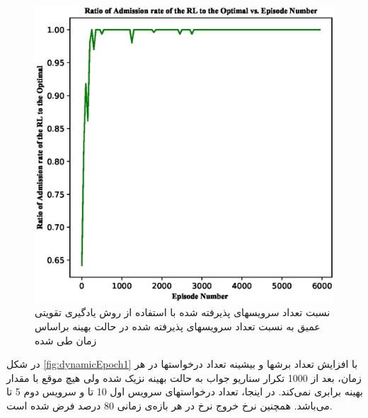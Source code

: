 \begin{figure}%
	\centering
	\includegraphics[scale = 0.6]{./fig/dynamicEpoch_0} %
	\caption{  نسبت تعداد سرویسهای پذیرفته شده با استفاده از روش یادگیری تقویتی عمیق به نسبت تعداد سرویسهای پذیرفته شده در حالت بهینه براساس زمان طی شده}
	\label{fig:dynamicEpoch}
\end{figure}
در شکل \ref{fig:dynamicEpoch1}
با افزایش تعداد برشها و بیشینه تعداد درخواستها در هر زمان، بعد از 1000 تکرار سناریو جواب به حالت بهینه نزیک شده ولی هیچ موقع با مقدار بهینه برابری نمی‌کند. در اینجا، تعداد درخواستهای سرویس اول 10 تا و سرویس دوم 5 تا می‌باشد. همچنین نرخ خروج نرخ  در هر بازه‌ی زمانی $80$ درصد فرض شده است.%
